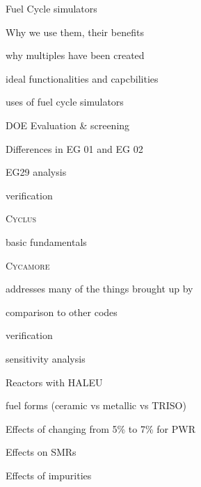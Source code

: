 \documentclass{report}
\newcommand{\Cyclus}{\textsc{Cyclus}\xspace}%
\newcommand{\Cycamore}{\textsc{Cycamore}\xspace}%
\begin{document}
\begin{outline}
\begin{outline}
    \item Fuel Cycle simulators
    \begin{outline}
        \item Why we use them, their benefits
        \item why multiples have been created
        \item ideal functionalities and capcbilities \cite{huff_next_2010,brown_identification_2016}
        \item uses of fuel cycle simulators
        \begin{outline}
            \item \gls{DOE} Evaluation \& screening \cite{wigeland_nuclear_2014}
                \begin{outline}
                      \item Differences in EG 01 and EG 02 
                \end{outline}
            \item EG29 analysis \cite{sunny_transition_2015}
            \item verification \cite{feng_standardized_2016}
        \end{outline}
        \item \Cyclus \cite{huff_fundamental_2016}
        \begin{outline}
              \item basic fundamentals 
              \item \Cycamore \cite{scopatz_cyclus_2015}
              \item addresses many of the things brought up by \cite{huff_next_2010}
              \item comparison to other codes \cite{djokic_application_2015}
              \item verification \cite{bae_standardized_2019}
        \end{outline}
        \item sensitivity analysis
    \end{outline}    
    \item Reactors with HALEU
    \begin{outline}
        \item fuel forms (ceramic vs metallic vs TRISO)
        \item Effects of changing from 5\% to 7\% for PWR \cite{burns_reactor_2020}
        \item Effects on SMRs \cite{carlson_implications_2022}
        \item Effects of impurities \cite{celikten_effects_2021}
    \end{outline}
\end{outline}


\end{outline}
\end{document}
